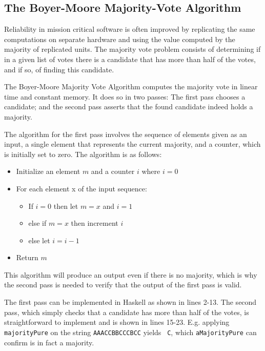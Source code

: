 \subsection{The Boyer-Moore Majority-Vote Algorithm}
\label{subsec:boyer_moore}


Reliability in mission critical software is often improved by replicating
the same computations on separate hardware and using the value computed by
the majority of replicated units. The majority vote problem consists of
determining if in a given list of votes there is a candidate that has more
than half of the votes, and if so, of finding this candidate.

The Boyer-Moore Majority Vote Algorithm \cite{MooreBoyer82,Hesselink2005}
computes the majority vote in linear time and constant memory. It does so in two passes: The
first pass chooses a candidate; and the second pass asserts that the
found candidate indeed holds a majority.

The algorithm for the first pass involves the sequence of elements given as an input,
a single element that represents the current majority, and a counter,
which is initially set to zero. The algorithm is as follows:
\begin{itemize}
\item Initialize an element $m$ and a counter $i$ where $i=0$
\item For each element x of the input sequence: 
	\begin{itemize} 
	\item If $i=0$ then let $m=x$ and $i=1$
	\item else if $m=x$ then increment $i$
	\item else let $i = i-1$
	\end{itemize}
\item Return $m$
\end{itemize}

This algorithm will produce an output even if there is no majority, which is why 
the second pass is needed to verify that the output of the first pass is valid. 




The first pass can be implemented in Haskell as shown in lines 2-13. The second pass, which
simply checks that a candidate has more than half of the votes, is
straightforward to implement and is shown in lines 15-23.
E.g. applying {\tt majorityPure} on the string {\tt AAACCBBCCCBCC} yields {\tt
  C}, which {\tt aMajorityPure} can confirm is in fact a majority.


